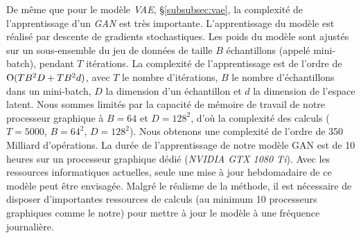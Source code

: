 De même que pour le modèle \textit{VAE}, §\ref{subsubsec:vae}, la complexité de l'apprentissage d'un \textit{GAN} est très importante.
L'apprentissage du modèle est réalisé par descente de gradients stochastiques.
Les poids du modèle sont ajustés sur un sous-ensemble du jeu de données de taille $B$ échantillons (appelé mini-batch), pendant $T$ itérations.
La complexité de l'apprentissage est de l'ordre de $\operatorname{O}(T B^2 D + T B^2 d)$, avec $T$ le nombre d'itérations, $B$ le nombre d'échantillons dans un mini-batch, $D$ la dimension d'un échantillon et $d$ la dimension de l'espace latent.
Nous sommes limités par la capacité de mémoire de travail de notre processeur graphique à $B=64$ et $D=128^2$, d'où la complexité des calculs ($T=5000$, $B=64^2$, $D=128^2$). Nous obtenons une complexité de l'ordre de 350 Milliard d'opérations.
La durée de l'apprentissage de notre modèle GAN est de 10 heures sur un processeur graphique dédié (\textit{NVIDIA GTX 1080 Ti}).
Avec les ressources informatiques actuelles, seule une mise à jour hebdomadaire de ce modèle peut être envisagée.
Malgré le réalisme de la méthode, il est nécessaire de disposer d'importantes ressources de calculs (au minimum 10 processeurs graphiques comme le notre) pour mettre à jour le modèle à une fréquence journalière.





%

